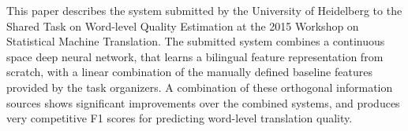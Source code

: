 This paper describes the system submitted by the University of Heidelberg to the Shared Task on Word-level Quality Estimation at the 2015 Workshop on Statistical Machine Translation. The submitted system combines a continuous space deep neural network, that learns a bilingual feature representation from scratch, with a linear combination of the manually defined baseline features provided by the task organizers. A combination of these orthogonal information sources shows significant improvements over the combined systems, and produces very competitive F1 scores for predicting word-level translation quality.
